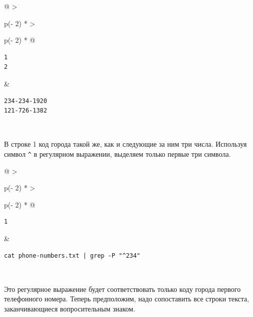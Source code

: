 \documentclass{report}
\begin{document}
\begin{longtable}[]{@{}
  >{\raggedright\arraybackslash}p{(\columnwidth - 2\tabcolsep) * }
  >{\raggedright\arraybackslash}p{(\columnwidth - 2\tabcolsep) * }@{}}
\toprule
\endhead
\begin{minipage}[t]{\linewidth}\raggedright
\begin{verbatim}
1
2
\end{verbatim}
\end{minipage} & \begin{minipage}[t]{\linewidth}\raggedright
\begin{verbatim}
234-234-1920
121-726-1382
\end{verbatim}
\end{minipage} \\ \addlinespace
\bottomrule
\end{longtable}

В строке 1 код города такой же, как и следующие за ним три числа.
Используя символ \texttt{\^{}} в регулярном выражении, выделяем только
первые три символа.

\begin{longtable}[]{@{}
  >{\raggedright\arraybackslash}p{(\columnwidth - 2\tabcolsep) * }
  >{\raggedright\arraybackslash}p{(\columnwidth - 2\tabcolsep) * }@{}}
\toprule
\endhead
\begin{minipage}[t]{\linewidth}\raggedright
\begin{verbatim}
1
\end{verbatim}
\end{minipage} & \begin{minipage}[t]{\linewidth}\raggedright
\begin{verbatim}
cat phone-numbers.txt | grep -P "^234"
\end{verbatim}
\end{minipage} \\ \addlinespace
\bottomrule
\end{longtable}

Это регулярное выражение будет соответствовать только коду города
первого телефонного номера. Теперь предположим, надо сопоставить все
строки текста, заканчивающиеся вопросительным знаком.
\end{document}
